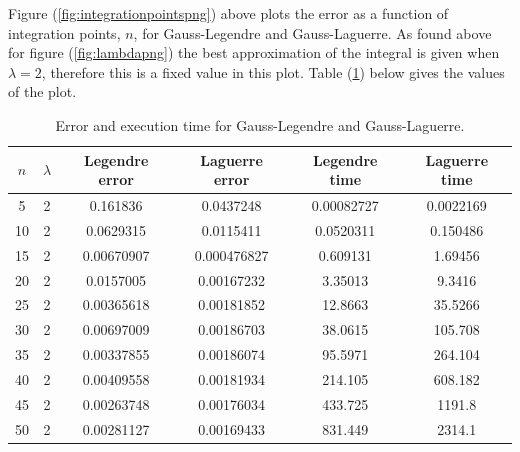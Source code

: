 \documentclass{article}
\begin{document}
  Figure (\ref{fig:integrationpointspng}) above plots the error as a function of integration points, $n$, for Gauss-Legendre and Gauss-Laguerre. As found above for figure (\ref{fig:lambdapng}) the best approximation of the integral is given when $\lambda = 2$, therefore this is a fixed value in this plot. Table (\ref{tab:error-gauss}) below gives the values of the plot. \\

  \begin{table}[ht]
    \centering
    \caption{Error and execution time for Gauss-Legendre and Gauss-Laguerre.}
    \vspace{2mm}
    \label{tab:error-gauss}
    \begin{tabular}{|c|c|c|c|c|c|}
        \hline
        $n$ & $\lambda$ & Legendre error & Laguerre error & Legendre time & Laguerre time \\
        \hline \hline
        5 & 2 & 0.161836 & 0.0437248 & 0.00082727 & 0.0022169 \\
        10 & 2 & 0.0629315 & 0.0115411 & 0.0520311 & 0.150486 \\
        15 & 2 & 0.00670907 & 0.000476827 & 0.609131 & 1.69456 \\
        20 & 2 & 0.0157005 & 0.00167232 & 3.35013 & 9.3416 \\
        25 & 2 & 0.00365618 & 0.00181852 & 12.8663 & 35.5266 \\
        30 & 2 & 0.00697009 & 0.00186703 & 38.0615 & 105.708 \\
        35 & 2 & 0.00337855 & 0.00186074 & 95.5971 & 264.104 \\
        40 & 2 & 0.00409558 & 0.00181934 & 214.105 & 608.182 \\
        45 & 2 & 0.00263748 & 0.00176034 & 433.725 & 1191.8 \\
        50 & 2 & 0.00281127 & 0.00169433 & 831.449 & 2314.1 \\
        \hline
    \end{tabular} \\
    \hspace{0pt}\\
  \end{table}

\newpage
\clearpage
\end{document}
